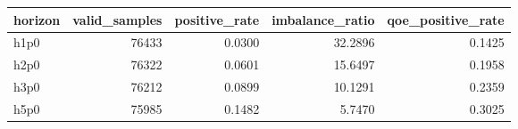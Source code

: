 \begin{tabular}{lrrrr}
\toprule
horizon & valid\_samples & positive\_rate & imbalance\_ratio & qoe\_positive\_rate \\
\midrule
h1p0 & 76433 & 0.0300 & 32.2896 & 0.1425 \\
h2p0 & 76322 & 0.0601 & 15.6497 & 0.1958 \\
h3p0 & 76212 & 0.0899 & 10.1291 & 0.2359 \\
h5p0 & 75985 & 0.1482 & 5.7470 & 0.3025 \\
\bottomrule
\end{tabular}

